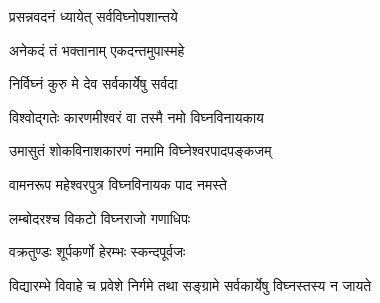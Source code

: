 
{प्रसन्नवदनं ध्यायेत् सर्वविघ्नोपशान्तये}

{अनेकदं तं भक्तानाम् एकदन्तमुपास्महे}

{निर्विघ्नं कुरु मे देव सर्वकार्येषु सर्वदा}

{विश्वोद्गतेः कारणमीश्वरं वा तस्मै नमो विघ्नविनायकाय}

{उमासुतं शोकविनाशकारणं नमामि विघ्नेश्वरपादपङ्कजम्}

{वामनरूप महेश्वरपुत्र विघ्नविनायक पाद नमस्ते}

{लम्बोदरश्च विकटो विघ्नराजो गणाधिपः}

{वक्रतुण्डः शूर्पकर्णो हेरम्भः स्कन्दपूर्वजः}

{विद्यारम्भे विवाहे च प्रवेशे निर्गमे तथा}
{सङ्ग्रामे सर्वकार्येषु विघ्नस्तस्य न जायते}
